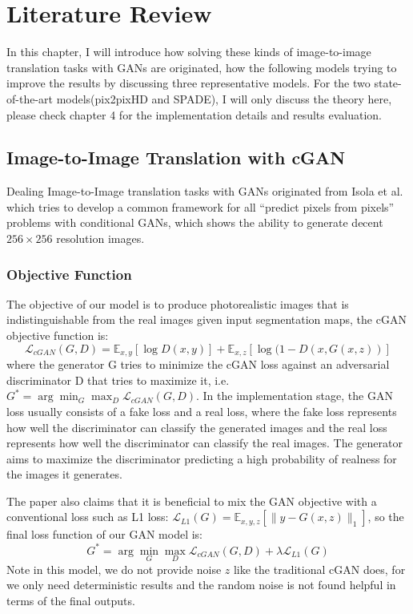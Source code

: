 \chapter{Literature Review}
\label{cha:review}
In this chapter, I will introduce how solving these kinds of image-to-image
translation tasks with GANs are originated, how the following models trying 
to improve the results by discussing three representative models.
For the two state-of-the-art models(pix2pixHD and SPADE), I will only discuss
the theory here, please check chapter 4 for the implementation details and
results evaluation.

\section{Image-to-Image Translation with cGAN}
Dealing Image-to-Image translation tasks with GANs originated from Isola et al.\cite{pix2pix2016}
which tries to develop a common framework for all “predict pixels from pixels” problems with 
conditional GANs, which shows the ability to generate decent $256\times256$ resolution images. 

\subsection{Objective Function}
The objective of our model is to produce photorealistic images that is indistinguishable from the 
real images given input segmentation maps, the cGAN objective function is:
$$\mathcal{L}_{c G A N}(G, D)=\mathbb{E}_{x, y}[\log D(x, y)]+\mathbb{E}_{x, z}[\log (1-D(x, G(x, z))]$$
where the generator G tries to minimize the cGAN loss against an adversarial discriminator D that 
tries to maximize it, i.e. $G^{*}=\arg \min _{G} \max _{D} \mathcal{L}_{c G A N}(G, D)$.
In the implementation stage, the GAN loss usually consists of a fake loss and a real loss, where 
the fake loss represents how well the discriminator can classify the generated images and 
the real loss represents how well the discriminator can classify the real images. The generator 
aims to maximize the discriminator predicting a high probability of realness for the 
images it generates.


The paper also claims that it is beneficial to mix the GAN objective with a conventional loss 
such as L1 loss: $\mathcal{L}_{L 1}(G)=\mathbb{E}_{x, y, z}\left[\|y-G(x, z)\|_{1}\right]$, so
the final loss function of our GAN model is:
$$G^{*}=\arg \min _{G} \max _{D} \mathcal{L}_{c G A N}(G, D)+\lambda \mathcal{L}_{L 1}(G)$$
Note in this model, we do not provide noise $z$ like the traditional cGAN does, for we only need 
deterministic results and the random noise is not found helpful in terms of the final outputs.

